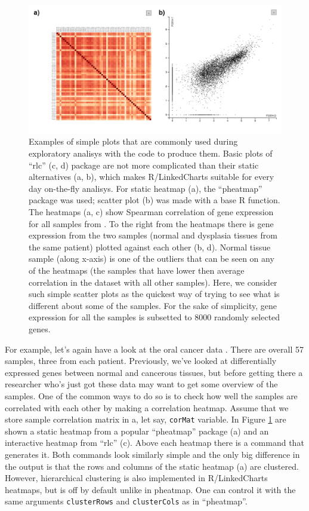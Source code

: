 \documentclass[twocolumn,10pt]{article}
\begin{document}
\begin{figure}
  \includegraphics[width=\textwidth]{FigE/figE.png}
  \caption{Examples of simple plots that are commonly used during exploratory analisys with the code to produce them. Basic plots of ``rlc'' (c, d) package are not more complicated than their static alternatives (a, b), which makes R/LinkedCharts suitable for every day on-the-fly analisys. For static heatmap (a), the ``pheatmap'' package was used; scatter plot (b) was made with a base R function. The heatmaps (a, c) show Spearman correlation of gene expression for all samples from \citet{conway_2015}. To the right from the heatmaps there is gene expression from the two samples (normal and dysplasia tissues from the same patient) plotted against each other (b, d). Normal tissue sample (along x-axis) is one of the outliers that can be seen on any of the heatmaps (the samples that have lower then average correlation in the dataset with all other samples). Here, we consider such simple scatter plots as the quickest way of trying to see what is different about some of the samples. For the sake of simplicity, gene expression for all the samples is subsetted to 8000 randomly selected genes.}
  \label{FigE}
\end{figure}
 
For example, let's again have a look at the oral cancer data \citep{conway_2015}. There are overall 57 samples, three from each patient. Previously, we've looked at differentially expressed genes between normal and cancerous tissues, but before getting there a researcher who's just got these data may want to get some overview of the samples. One of the common ways to do so is to check how well the samples are correlated with each other by making a correlation heatmap. Assume that we store sample correlation matrix in a, let say, \texttt{corMat} variable. In Figure \ref{FigE} are shown a static heatmap from a popular ``pheatmap'' package (a) and an interactive heatmap from ``rlc'' (c). Above each heatmap there is a command that generates it. Both commands look similarly simple and the only big difference in the output is that the rows and columns of the static heatmap (a) are clustered. However, hierarchical clustering is also implemented in R/LinkedCharts heatmaps, but is off by default unlike in pheatmap. One can control it with the same arguments \texttt{clusterRows} and \texttt{clusterCols} as in ``pheatmap''.
\end{document}
